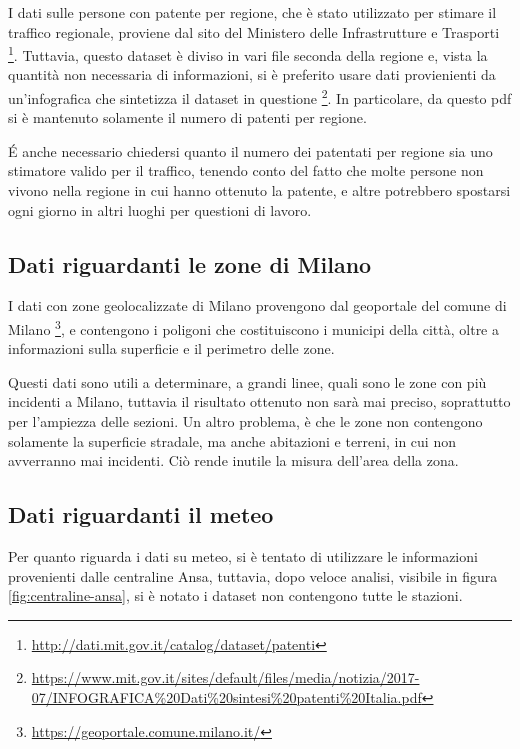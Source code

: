 \documentclass[a4paper]{report}
\begin{document}
I dati sulle persone con patente per regione, che è stato utilizzato per stimare il traffico 
regionale, proviene dal sito del Ministero delle Infrastrutture e Trasporti 
\footnote{\url{http://dati.mit.gov.it/catalog/dataset/patenti}}.
Tuttavia, questo dataset è diviso in vari file seconda della regione e, vista la quantità 
non necessaria di informazioni, si è preferito usare dati provienienti da un'infografica che 
sintetizza il dataset in questione
\footnote{\url{https://www.mit.gov.it/sites/default/files/media/notizia/2017-07/INFOGRAFICA\%20Dati\%20sintesi\%20patenti\%20Italia.pdf}}.
In particolare, da questo pdf si è mantenuto solamente il numero di patenti per regione.

\'E anche necessario chiedersi quanto il numero dei patentati per regione sia uno stimatore 
valido per il traffico, tenendo conto del fatto che molte persone non vivono nella regione 
in cui hanno ottenuto la patente, e altre potrebbero spostarsi ogni giorno in altri 
luoghi per questioni di lavoro.

\subsection{Dati riguardanti le zone di Milano}

I dati con zone geolocalizzate di Milano provengono dal geoportale del comune di Milano
\footnote{\url{https://geoportale.comune.milano.it/}}, e contengono i poligoni che costituiscono 
i municipi della città, 
oltre a informazioni sulla superficie e il perimetro delle zone.

Questi dati sono utili a determinare, a grandi linee, quali sono le zone con più incidenti 
a Milano, tuttavia il risultato ottenuto non sarà mai preciso, 
soprattutto per l'ampiezza delle sezioni.
Un altro problema, è che le zone non contengono solamente la superficie stradale, ma anche 
abitazioni e terreni, in cui non avverranno mai incidenti. 
Ciò rende inutile la misura dell'area della zona.

\subsection{Dati riguardanti il meteo}

Per quanto riguarda i dati su meteo, si è tentato di utilizzare le informazioni provenienti dalle 
centraline Ansa, tuttavia, dopo veloce analisi, visibile in figura \ref{fig:centraline-ansa}, 
si è notato i dataset non contengono tutte le stazioni.
\end{document}
